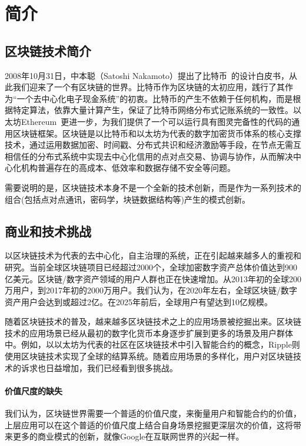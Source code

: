 \section{简介}

\subsection{区块链技术简介}
2008年10⽉31⽇，中本聪（Satoshi Nakamoto）提出了⽐特币~\cite{Nakamoto2008}的设计⽩⽪书，从此我们迎来了⼀个有区块链的世界。⽐特币作为区块链的太初应⽤，践⾏了其作为“⼀个去中⼼化电⼦现⾦系统”的初衷。比特币的产生不依赖于任何机构，而是根据特定算法，依靠大量计算产生，保证了比特币网络分布式记账系统的一致性。以太坊Ethereum~\cite{buterin2014ethereum}更进一步，为我们提供了一个可以运行具有图灵完备性的代码的通用区块链框架。区块链是以比特币和以太坊为代表的数字加密货币体系的核心支撑技术，通过运用数据加密、时间戳、分布式共识和经济激励等手段，在节点无需互相信任的分布式系统中实现去中心化信用的点对点交易、协调与协作，从而解决中心化机构普遍存在的高成本、低效率和数据存储不安全等问题。

需要说明的是，区块链技术本身不是一个全新的技术创新，而是作为一系列技术的组合(包括点对点通讯，密码学，块链数据结构等)产生的模式创新。

\subsection{商业和技术挑战}
以区块链技术为代表的去中心化，自主治理的系统，正在引起越来越多人的重视和研究。当前全球区块链项目已经超过2000个，全球加密数字资产总体价值达到900亿美元。区块链/数字资产领域的用户人群也正在快速增加。从2013年初的全球200万用户，到2017年初的2000万用户。我们认为，在2020年左右，全球区块链/数字资产用户会达到或超过2亿。在2025年前后，全球用户有望达到10亿规模。

随着区块链技术的普及，越来越多区块链技术之上的应用场景被挖掘出来。区块链技术的应用场景已经从最初的数字化货币本身逐步扩展到更多的场景及用户群体中。例如，以以太坊为代表的社区在区块链技术中引入智能合约的概念，Ripple则使用区块链技术实现了全球的结算系统。随着应用场景的多样化，用户对区块链技术的诉求也日益增加，我们已经看到很多挑战。

\paragraph{价值尺度的缺失}我们认为，区块链世界需要一个普适的价值尺度，来衡量用户和智能合约的价值，上层应用可以在这个普适的价值尺度上结合自身场景挖掘更深层次的价值，这将带来更多的商业模式的创新，就像Google在互联网世界的兴起一样。

